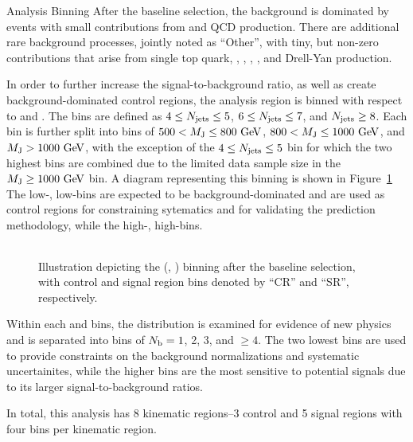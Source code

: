 \begin{section}{Analysis Binning}
After the baseline selection, the background is dominated by \ttbar events with small contributions from \Wjets and QCD production.
There are additional rare background processes, jointly noted as ``Other'', with tiny, but non-zero contributions that arise from single top quark, \ttW, \ttZ, \ttH, \tttt, and Drell-Yan production.

In order to further increase the signal-to-background ratio, as well as create background-dominated control regions, the analysis region is binned with respect to \Njets and \MJ. 
The \Njets bins are defined as $4 \leq N_{\mathrm{jets}} \leq 5$, $6 \leq N_{\mathrm{jets}} \leq 7$, and $N_{\mathrm{jets}} \geq 8$.
Each \Njets bin is further split into bins of $500 < M_\mathrm{J} \leq 800~\mathrm{Ge\kern -0.1em V}$, $800 < M_\mathrm{J} \leq 1000~\mathrm{Ge\kern -0.1em V}$, and $M_\mathrm{J} > 1000~\mathrm{Ge\kern -0.1em V}$, with the exception of the $4 \leq N_{\mathrm{jets}} \leq 5$ bin for which the two highest \MJ bins are combined due to the limited data sample size in the $M_\mathrm{J} \geq 1000~\mathrm{Ge\kern -0.1em V}$ bin.
A diagram representing this binning is shown in Figure~\ref{fig:analysis_regions}
The low-\Njets, low-\MJ bins are expected to be background-dominated and are used as control regions for constraining sytematics and for validating the prediction methodology, while the high-\Njets, high-\MJ bins.

\begin{figure}[tbp!]
\centering
  \begin{tabular}{ |c|c|c|c| }
    \hline
  \end{tabular}
  \caption{\label{fig:analysis_regions} Illustration depicting the (\Njets, \MJ) binning after the baseline selection, with control and signal region bins denoted by ``CR'' and ``SR'', respectively.}
\end{figure}

Within each \Njets and \MJ bins, the \Nb distribution is examined for evidence of new physics and is separated into bins of $N_\mathrm{b}=1$, 2, 3, and $\geq 4$.
The two lowest \Nb bins are used to provide constraints on the background normalizations and systematic uncertainites, while the higher \Nb bins are the most sensitive to potential signals due to its larger signal-to-background ratios.

In total, this analysis has 8 kinematic regions--3 control and 5 signal regions with four \Nb bins per kinematic region.

\end{section}

